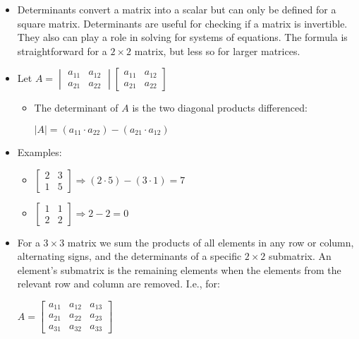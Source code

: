\begin{itemize}
    \item Determinants convert a matrix into a scalar but can only be defined for a square matrix. Determinants are useful for checking if a matrix is invertible. They also can play a role in solving for systems of equations. The formula is straightforward for a $2 \times 2$ matrix, but less so for larger matrices. 
    \item Let 
    $A = 
    \begin{vmatrix}
        a_{11} & a_{12} \\
        a_{21} & a_{22}
    \end{vmatrix}
    \begin{bmatrix}
        a_{11} & a_{12} \\
        a_{21} & a_{22}
    \end{bmatrix}$
    \begin{itemize}
        \item The determinant of $A$ is the two diagonal products differenced:
        
        $|A| = (a_{11} \cdot a_{22}) - (a_{21} \cdot a_{12})$
    \end{itemize}
    \item Examples:
    \begin{itemize}
        \item $\begin{bmatrix}
            2 & 3 \\ 
            1 & 5 
        \end{bmatrix} 
        \Rightarrow 
        (2 \cdot 5) - (3 \cdot 1) = 7$
        \item  $\begin{bmatrix}
            1 & 1 \\
            2 & 2 
        \end{bmatrix} 
        \Rightarrow 
        2 - 2  = 0$
    \end{itemize}

    \item For a $3 \times 3$ matrix we sum the products of all elements in any row or column, alternating signs, and the determinants of a specific $2 \times 2$ submatrix. An element's submatrix is the remaining elements when the elements from the relevant row and column are removed. I.e., for:
    
    $A = \begin{bmatrix}
        a_{11} & a_{12} & a_{13} \\
        a_{21} & a_{22} & a_{23} \\
        a_{31} & a_{32} & a_{33} 
    \end{bmatrix}$


\end{itemize}
